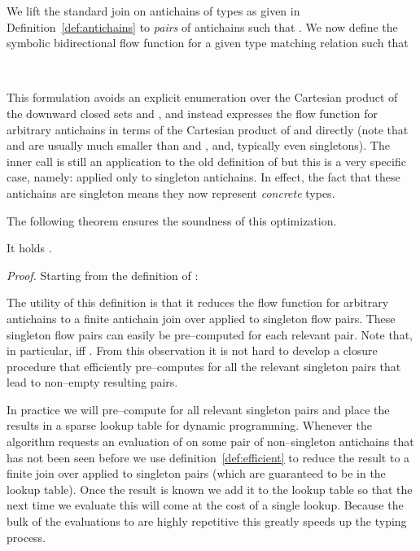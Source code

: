 \documentclass{sigplanconf}
\begin{document}
\begin{definition}\label{def:efficient}
We lift the standard join  on antichains of types as given in
Definition~\ref{def:antichains} to \emph{pairs} of antichains such
that . We now
define the symbolic bidirectional flow function  for a
given type matching relation  such that

\ 
\end{definition}
This formulation avoids an explicit enumeration over the Cartesian
product of the downward closed sets  and , and
instead expresses the flow function for arbitrary antichains in terms
of the Cartesian product of  and  directly (note that  and
 are usually much smaller than  and , and,
typically even singletons). The inner call is still an application to
the old definition of  but this is a very specific case,
namely:  applied only to singleton antichains. In effect,
the fact that these antichains are singleton means they now represent
\emph{concrete} types.

The following theorem ensures the soundness of this optimization.
\begin{samepage}
\begin{theorem}
It holds .
\end{theorem}
\emph{Proof.} Starting from the definition of :


\end{samepage}

The utility of this definition is that it reduces the flow function
for arbitrary antichains to a finite antichain join over 
applied to singleton flow pairs. These singleton flow pairs can easily
be pre--computed for each relevant pair. Note that, in particular,
 iff . From this observation it is not hard to develop a closure
procedure that efficiently pre--computes  for all the
relevant singleton pairs that lead to non--empty resulting pairs.

In practice we will pre--compute  for all relevant singleton
pairs and place the results in a sparse lookup table for dynamic
programming. Whenever the algorithm requests an evaluation of
 on some pair  of non--singleton antichains that has
not been seen before we use definition~\ref{def:efficient} to reduce
the result to a finite join over  applied to singleton pairs
(which are guaranteed to be in the lookup table). Once the result is
known we add it to the lookup table so that the next time we evaluate
 this will come at the cost of a single
lookup. Because the bulk of the evaluations to  are highly
repetitive this greatly speeds up the typing process.
\end{document}
